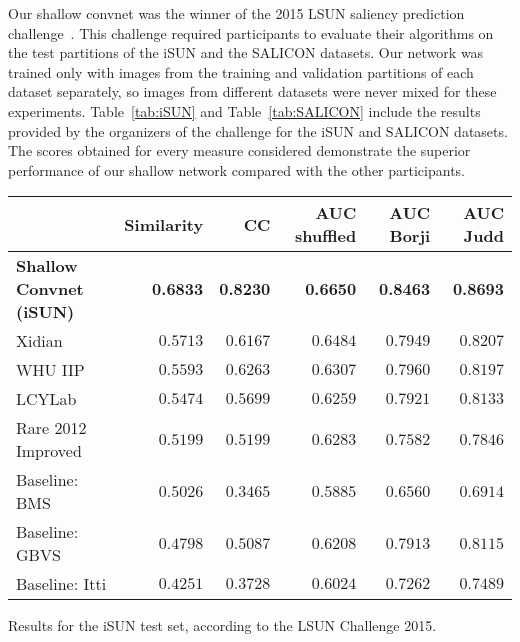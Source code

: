 \documentclass[10pt,twocolumn,letterpaper]{article}
\begin{document}
Our shallow convnet was the winner of the 2015 LSUN saliency prediction challenge~\cite{zhanglarge}. 
This challenge required participants to evaluate their algorithms on the test partitions of the iSUN and the SALICON datasets.
Our network was trained only with images from the training and validation partitions of each dataset separately, so images from different datasets were never mixed for these experiments.
Table~\ref{tab:iSUN} and Table~\ref{tab:SALICON} include the results provided by the organizers of the challenge for the iSUN and SALICON datasets.
The scores obtained for every measure considered demonstrate the superior performance of our shallow network compared with the other participants.
\begin{center}
\begin{tabular}{lrrrrr}
\toprule
					&	Similarity 	& CC 		& AUC shuffled 	& AUC Borji & AUC Judd \\
\midrule
\textbf{Shallow Convnet (iSUN)}	& \textbf{0.6833} 		& \textbf{0.8230}	& \textbf{0.6650} 		& \textbf{0.8463}	& \textbf{0.8693} \\
Xidian  				& $0.5713$ 		& $0.6167$	& $0.6484$ 		& $0.7949$	& $0.8207$ \\
WHU IIP 			& $0.5593$ 		& $0.6263$	& $0.6307$ 		& $0.7960$	& $0.8197$ \\
LCYLab 				& $0.5474$ 		& $0.5699$	& $0.6259$ 		& $0.7921$	& $0.8133$ \\
Rare 2012 Improved \cite{riche2013rare2012}	& $0.5199$ 		& $0.5199$	& $0.6283$ 		& $0.7582$	& $0.7846$ \\
\midrule
Baseline: BMS \cite{zhang2013saliency}		& $0.5026$ 		& $0.3465$	& $0.5885$ 		& $0.6560$	& $0.6914$ \\
Baseline: GBVS \cite{harel2006graph}		& $0.4798$ 		& $0.5087$	& $0.6208$ 		& $0.7913$	& $0.8115$ \\
Baseline: Itti \cite{itti1998model}		& $0.4251$ 		& $0.3728$	& $0.6024$ 		& $0.7262$	& $0.7489$ \\
\bottomrule
\end{tabular}
\end{center}
\caption{Results for the iSUN test set, according to the LSUN Challenge 2015.}
\label{tab:iSUN}
\end{document}
